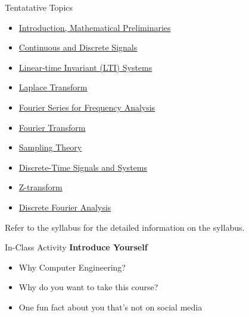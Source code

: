 \documentclass[aspectratio=169,xcolor=dvipsnames,svgnames,x11names,fleqn]{beamer}
\begin{document}
\begin{frame}{Tentatative Topics}
\small
\begin{itemize}
	\item \color{DodgerBlue4} \underline{Introduction, Mathematical Preliminaries}
 
    \item \color{Firebrick3} \underline{Continuous and Discrete Signals} 
    
    \item  \color{DodgerBlue4} \underline{Linear-time Invariant (LTI) Systems}
    
    \item   \color{Firebrick3} \underline{Laplace Transform}
    
    \item  \color{DodgerBlue4} \underline{Fourier Series for Frequency Analysis} 


    \item  \color{Firebrick3} \underline{Fourier Transform} 
    
    \item \color{DodgerBlue4} \underline{Sampling Theory} 
    \item   \color{Firebrick3}  \underline{Discrete-Time Signals and Systems}
    
    \item  \color{DodgerBlue4} \underline{Z-transform}
    \item  \color{Firebrick3} \underline{Discrete Fourier Analysis} 
   
\end{itemize}
\begin{center}
    Refer to the syllabus for the detailed information on the syllabus.
\end{center}
\end{frame}

\begin{frame}{In-Class Activity}
  \centering
  \textbf{Introduce Yourself} \\[1em]
  
  \begin{block}{}
    \begin{itemize}
      \item Why Computer Engineering?
      \item Why do you want to take this course?
      \item One fun fact about you that’s not on social media
    \end{itemize}
  \end{block}

\end{frame}
\end{document}
